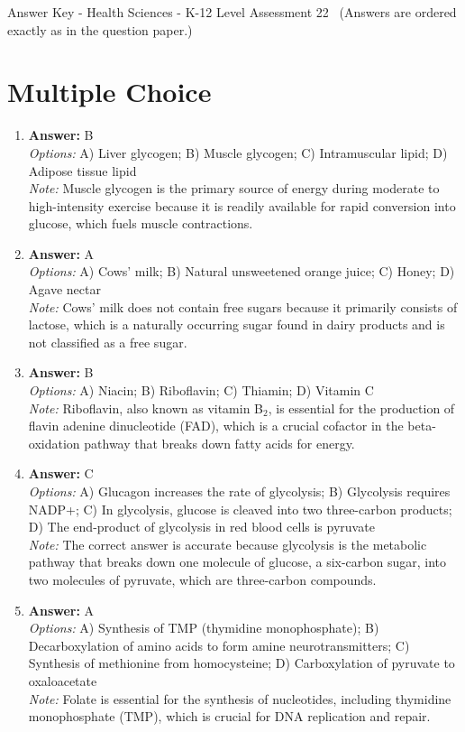 \documentclass[12pt]{article}
\begin{document}
\begin{center}
Answer Key - Health Sciences - K-12 Level Assessment 22 \
\small (Answers are ordered exactly as in the question paper.)
\end{center}

\section*{Multiple Choice}
\begin{enumerate}[label=\arabic*.]
\item \textbf{Answer:} B
\\ \textit{Options:} A) Liver glycogen; B) Muscle glycogen; C) Intramuscular lipid; D) Adipose tissue lipid
\\ \textit{Note:} Muscle glycogen is the primary source of energy during moderate to high-intensity exercise because it is readily available for rapid conversion into glucose, which fuels muscle contractions.
\item \textbf{Answer:} A
\\ \textit{Options:} A) Cows' milk; B) Natural unsweetened orange juice; C) Honey; D) Agave nectar
\\ \textit{Note:} Cows' milk does not contain free sugars because it primarily consists of lactose, which is a naturally occurring sugar found in dairy products and is not classified as a free sugar.
\item \textbf{Answer:} B
\\ \textit{Options:} A) Niacin; B) Riboflavin; C) Thiamin; D) Vitamin C
\\ \textit{Note:} Riboflavin, also known as vitamin B$_{2}$, is essential for the production of flavin adenine dinucleotide (FAD), which is a crucial cofactor in the beta-oxidation pathway that breaks down fatty acids for energy.
\item \textbf{Answer:} C
\\ \textit{Options:} A) Glucagon increases the rate of glycolysis; B) Glycolysis requires NADP+; C) In glycolysis, glucose is cleaved into two three-carbon products; D) The end-product of glycolysis in red blood cells is pyruvate
\\ \textit{Note:} The correct answer is accurate because glycolysis is the metabolic pathway that breaks down one molecule of glucose, a six-carbon sugar, into two molecules of pyruvate, which are three-carbon compounds.
\item \textbf{Answer:} A
\\ \textit{Options:} A) Synthesis of TMP (thymidine monophosphate); B) Decarboxylation of amino acids to form amine neurotransmitters; C) Synthesis of methionine from homocysteine; D) Carboxylation of pyruvate to oxaloacetate
\\ \textit{Note:} Folate is essential for the synthesis of nucleotides, including thymidine monophosphate (TMP), which is crucial for DNA replication and repair.
\end{enumerate}
\end{document}
